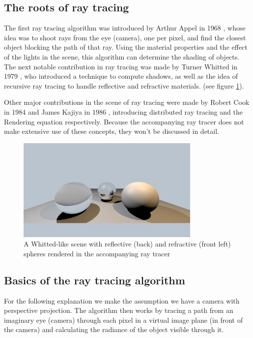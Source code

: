 \documentclass{article}
\begin{document}
\subsection{The roots of ray tracing}
The first ray tracing algorithm was introduced by Arthur Appel in 1968 \cite{appel}, whose idea was to shoot rays from the eye (camera), one per pixel, and find the closest object blocking the path of that ray. Using the material properties and the effect of the lights in the scene, this algorithm can determine the shading of objects. \\
The next notable contribution in ray tracing was made by Turner Whitted in 1979 \cite{whitted}, who introduced a technique to compute shadows, as well as the idea of recursive ray tracing to handle reflective and refractive materials. (see figure \ref{fig:whitted_example}).  

Other major contributions in the scene of ray tracing were made by Robert Cook in 1984 \cite{cook} and James Kajiya in 1986 \citep{kajiya}, introducing distributed ray tracing and the Rendering equation respectively. Because the accompanying ray tracer does not make extensive use of these concepts, they won't be discussed in detail.

\begin{figure}[h]
	\centering
    \includegraphics[width=0.8\textwidth]{whitted_example}
    \caption{A Whitted-like scene with reflective (back) and refractive (front left) spheres rendered in the accompanying ray tracer}
    \label{fig:whitted_example}
\end{figure}

\subsection{Basics of the ray tracing algorithm}
For the following explanation we make the assumption we have a camera with perspective projection. The algorithm then works by tracing a path from an imaginary eye (camera) through each pixel in a virtual image plane (in front of the camera) and calculating the radiance of the object visible through it.
\end{document}
